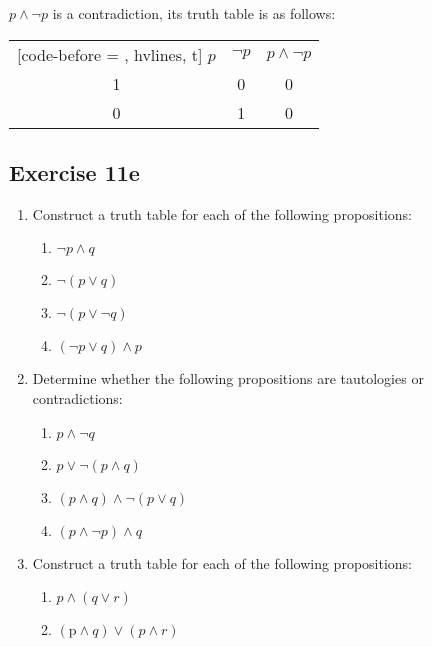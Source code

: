 \documentclass{report}
\begin{document}
$p \land \neg p$ is a contradiction, its truth table is as follows:
\begin{center}
    \begin{NiceTabular}{|c|c|c|}[code-before = , hvlines, t]
        $p$ & $\neg p$ & $p \land \neg p$ \\
        1   & 0        & 0                \\
        0   & 1        & 0                \\
    \end{NiceTabular}
\end{center}

\subsection*{Exercise 11e}
\begin{enumerate}[leftmargin=*]
    \item Construct a truth table for each of the following propositions:
          \begin{enumerate}[leftmargin=*]
              \item $\neg p \land q$
              \item $\neg(p \lor q)$
              \item $\neg(p \lor \neg q)$
              \item $(\neg p \lor q) \land p$
          \end{enumerate}
    \item Determine whether the following propositions are tautologies or contradictions:
          \begin{enumerate}[leftmargin=*]
              \item $p \land \neg q$
              \item $p \lor \neg(p \land q)$
              \item $(p \land q) \land \neg(p \lor q)$
              \item $(p \land \neg p) \land q$
          \end{enumerate}
    \item Construct a truth table for each of the following propositions:
          \begin{enumerate}[leftmargin=*]
              \item $p \land(q \lor r)$
              \item $(\mathrm{p} \land q) \lor(p \land r)$
          \end{enumerate}
\end{enumerate}
\end{document}
